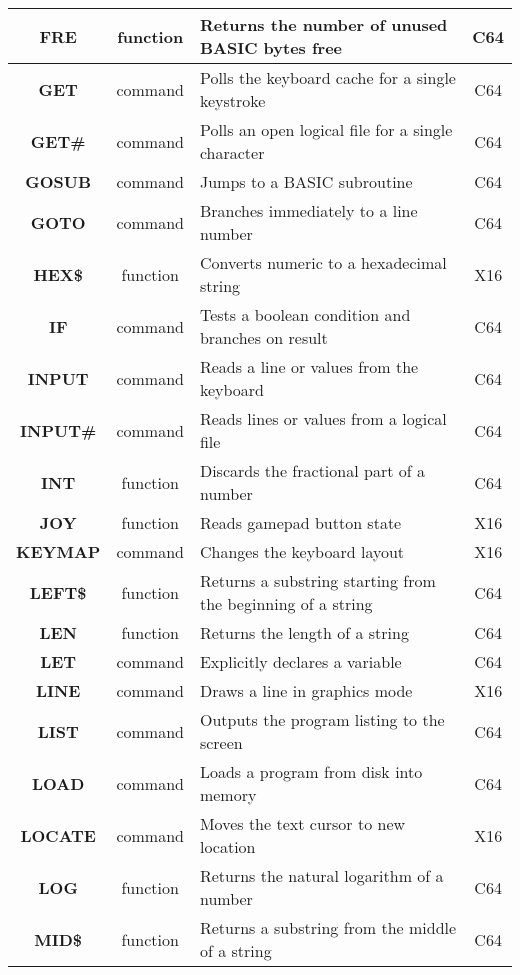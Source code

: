 \begin{longtable}{|c|c|m{4cm}|c|}
	{\bfseries FRE} & function & Returns the number of unused BASIC bytes free & C64 \\ \hline
	{\bfseries GET} & command & Polls the keyboard cache for a single keystroke & C64 \\ \hline
	{\bfseries GET\#} & command & Polls an open logical file for a single character & C64 \\ \hline
	{\bfseries GOSUB} & command & Jumps to a BASIC subroutine & C64 \\ \hline
	{\bfseries GOTO} & command & Branches immediately to a line number & C64 \\ \hline
	{\bfseries HEX\$} & function & Converts numeric to a hexadecimal string & X16 \\ \hline
	{\bfseries IF} & command & Tests a boolean condition and branches on result & C64 \\ \hline
	{\bfseries INPUT} & command & Reads a line or values from the keyboard & C64 \\ \hline
	{\bfseries INPUT\#} & command & Reads lines or values from a logical file & C64 \\ \hline
	{\bfseries INT} & function & Discards the fractional part of a number & C64 \\ \hline
	{\bfseries JOY} & function & Reads gamepad button state & X16 \\ \hline
	{\bfseries KEYMAP} & command & Changes the keyboard layout & X16 \\ \hline
	{\bfseries LEFT\$} & function & Returns a substring starting from the beginning of a string & C64 \\ \hline
	{\bfseries LEN} & function & Returns the length of a string & C64 \\ \hline
	{\bfseries LET} & command & Explicitly declares a variable & C64 \\ \hline
	{\bfseries LINE} & command & Draws a line in graphics mode & X16 \\ \hline
	{\bfseries LIST} & command & Outputs the program listing to the screen & C64 \\ \hline
	{\bfseries LOAD} & command & Loads a program from disk into memory & C64 \\ \hline
	{\bfseries LOCATE} & command & Moves the text cursor to new location & X16 \\ \hline
	{\bfseries LOG} & function & Returns the natural logarithm of a number & C64 \\ \hline
	{\bfseries MID\$} & function & Returns a substring from the middle of a string & C64 \\ \hline

\end{longtable}
